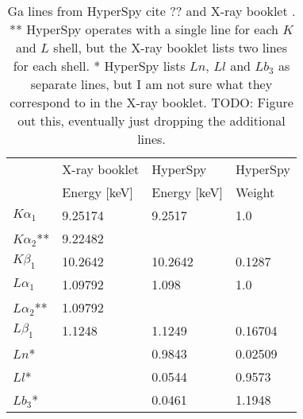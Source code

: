 
\begin{table}[tbp]
    \centering
    \caption{
        Ga lines from HyperSpy cite ?? and X-ray booklet \cite{thompson_x-ray_2004}.
        ** HyperSpy operates with a single line for each $K$ and $L$ shell, but the X-ray booklet lists two lines for each shell.
        * HyperSpy lists $Ln$, $Ll$ and $Lb_3$ as separate lines, but I am not sure what they correspond to in the X-ray booklet.
        TODO: Figure out this, eventually just dropping the additional lines.
    }
    \label{tab:theory:Ga-lines}
    \begin{tabular}{llll}
                       & X-ray booklet & HyperSpy     & HyperSpy \\
                       & Energy [keV]  & Energy [keV] & Weight   \\
        \hline
        $K \alpha_1$   & 9.25174       & 9.2517       & 1.0      \\
        $K \alpha_2$** & 9.22482       &              &          \\
        $K \beta_1$    & 10.2642       & 10.2642      & 0.1287   \\
        $L \alpha_1$   & 1.09792       & 1.098        & 1.0      \\
        $L \alpha_2$** & 1.09792       &              &          \\
        $L \beta_1$    & 1.1248        & 1.1249       & 0.16704  \\
        $Ln$*          &               & 0.9843       & 0.02509  \\
        $Ll$*          &               & 0.0544       & 0.9573   \\
        $Lb_3$*        &               & 0.0461       & 1.1948
    \end{tabular}

\end{table}